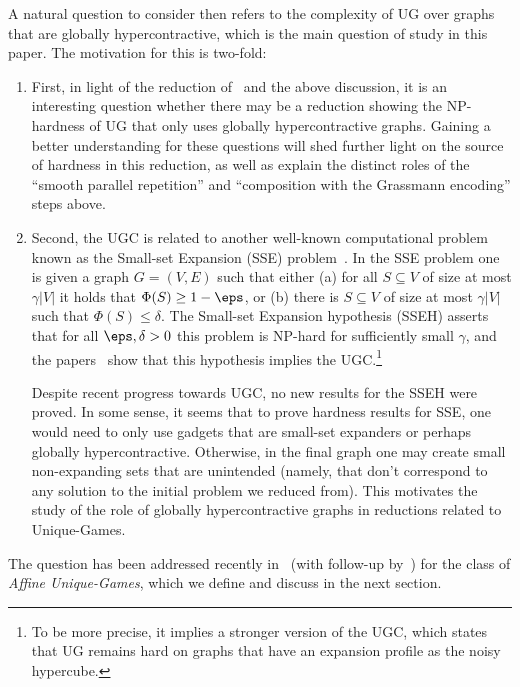 A natural question to consider then refers to the 
complexity of UG over graphs that are
globally hypercontractive, which is the main question 
of study in this paper. The motivation for this 
is two-fold:
\begin{enumerate}
    \item First, in light of 
the reduction of~\cite{KhotMS17,DBLP:conf/stoc/DinurKKMS18a,DinurKKMS18,KhotMS18} and the above discussion, it is an interesting 
question whether there may be a reduction showing the NP-hardness of UG that only uses globally hypercontractive graphs. Gaining a better understanding for these questions will shed further
light on the source of hardness in this reduction, as well as explain the distinct roles of the ``smooth parallel repetition'' and ``composition with the Grassmann encoding'' steps above.

\item Second, the UGC is related to another well-known computational problem known as the Small-set Expansion (SSE) problem~\cite{RaghavendraS10,RaghavendraST12}. In the SSE problem one is given a graph $G = (V,E)$ such that either (a) for all $S\subseteq V$ of size at most $\gamma|V|$ it holds that $\Phi(S)\geq 1-\eps$, or (b) there is $S\subseteq V$ of size at most $\gamma|V|$ such that $\Phi(S)\leq \delta$. The
Small-set Expansion hypothesis (SSEH) asserts that for all $\eps,\delta>0$
this problem is NP-hard for sufficiently small $\gamma$, and the 
papers~\cite{RaghavendraS10,RaghavendraST12} show that this 
hypothesis implies the UGC.\footnote{To be more precise, it implies
a stronger version of the UGC, which states that UG 
remains hard on graphs that have an expansion profile
as the noisy hypercube.} 

Despite recent progress towards UGC, no new results for the SSEH were proved. In some sense, it seems that to prove hardness results for SSE, one would need 
to only use gadgets that are small-set expanders or perhaps globally hypercontractive. Otherwise, in the final graph one may create small non-expanding sets that are unintended (namely, that don't correspond to any solution to the 
initial problem we reduced from). This motivates the study of the role of globally hypercontractive graphs in reductions related to Unique-Games.
\end{enumerate}

The question has been addressed recently in~\cite{BBKSS} (with 
follow-up by~\cite{DBLP:conf/soda/BafnaHKL22}) for the class of \emph{Affine 
Unique-Games}, which we define and discuss in the next section.

